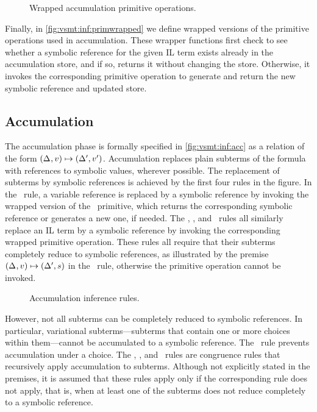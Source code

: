 \begin{figure}
  
  \caption{Wrapped accumulation primitive operations.}
  \label{fig:vsmt:inf:primwrapped}
\end{figure}


Finally, in \autoref{fig:vsmt:inf:primwrapped} we define wrapped versions of the
primitive operations used in accumulation. These wrapper functions first check
to see whether a symbolic reference for the given IL term exists already in the
accumulation store, and if so, returns it without changing the store.
Otherwise, it invokes the corresponding primitive operation to generate and
return the new symbolic reference and updated store.


\subsection{Accumulation}
%
The accumulation phase is formally specified in \autoref{fig:vsmt:inf:acc} as a
relation of the form $(\Delta_{},v)\mapsto{}(\Delta_{}',v')$.
%
Accumulation replaces plain subterms of the formula with references to symbolic
values, wherever possible. The replacement of subterms by symbolic references
is achieved by the first four rules in the figure. In the \acRef\ rule, a
variable reference is replaced by a symbolic reference by invoking the wrapped
version of the \pspawn\ primitive, which returns the corresponding symbolic
reference or generates a new one, if needed.
%
The \acNotS, \acAndS, and \acOrS\ rules all similarly replace an IL term by a
symbolic reference by invoking the corresponding wrapped primitive operation.
These rules all require that their subterms completely reduce to symbolic
references, as illustrated by the premise
$(\Delta_{},v)\mapsto{}(\Delta_{}',s)$ in the \acNotS\ rule, otherwise the
primitive operation cannot be invoked.


\begin{figure}
  
  \caption{Accumulation inference rules.}
  \label{fig:vsmt:inf:acc}
\end{figure}


However, not all subterms can be completely reduced to symbolic references. In
particular, variational subterms---subterms that contain one or more choices
within them---cannot be accumulated to a symbolic reference.
%
The \acChc\ rule prevents accumulation under a choice.
%
The \acNotV, \acAndV, and \acOrV\ rules are congruence rules that recursively
apply accumulation to subterms. Although not explicitly stated in the premises,
it is assumed that these  rules apply only if the corresponding
 rule does not apply, that is, when at least one of the subterms does
not reduce completely to a symbolic reference.



